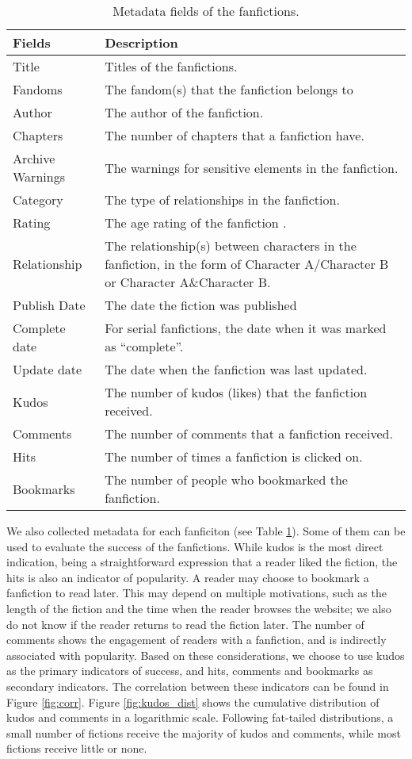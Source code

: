 \documentclass[a4paper]{article}
\begin{document}
\begin{table}
\centering
\begin{tabular}[width=0.8\textwidth]{p{3cm}p{10cm}}
\toprule
Fields & Description \\ 
   \hline			
Title & Titles of the fanfictions.  \\
Fandoms & The fandom(s) that the fanfiction belongs to \\
Author & The author of the fanfiction.  \\
Chapters & The number of chapters that a fanfiction have. \\
Archive Warnings & The warnings for sensitive elements in the fanfiction. \\
Category & The type of relationships in the fanfiction. \\
Rating & The age rating of the fanfiction . \\
Relationship & The relationship(s) between characters in the fanfiction, in the form of Character A/Character B
or Character A\&Character B. \\
Publish Date & The date the fiction was published \\
Complete date & For serial fanfictions, the date when it was marked as ``complete''.\\
Update date & The date when the fanfiction was last updated. \\
\hline
Kudos & The number of kudos (likes) that the fanfiction received. \\
Comments & The number of comments that a fanfiction received.\\
Hits & The number of times a fanfiction is clicked on. \\
Bookmarks & The number of people who bookmarked the fanfiction.\\

\bottomrule
\end{tabular}
\caption{Metadata fields of the fanfictions.}
\label{tab:metadata}
\end{table}%

We also collected metadata for each fanficiton (see Table \ref{tab:metadata}). Some of them can be used to evaluate the success of the fanfictions. While kudos is the most direct indication, being a straightforward expression that a reader liked the fiction, the hits is also an indicator of popularity. A reader may choose to bookmark a fanfiction to read later. This may depend on multiple motivations, such as the length of the fiction and the time when the reader browses the website; we also do not know if the reader returns to read the fiction later. The number of comments shows the engagement of readers with a fanfiction, and is indirectly associated with popularity. Based on these considerations, we choose to use kudos as the primary indicators of success, and hits, comments and bookmarks as secondary indicators. The correlation between these indicators can be found in Figure \ref{fig:corr}. Figure \ref{fig:kudos_dist} shows the cumulative distribution of kudos and comments in a logarithmic scale. Following fat-tailed distributions, a small number of fictions receive the majority of kudos and comments, while most fictions receive little or none. 
\end{document}
